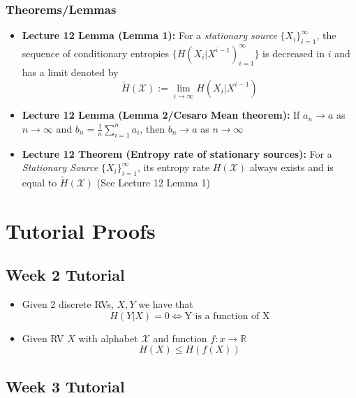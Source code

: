 \documentclass{article}
\begin{document}
\subsubsection{Theorems/Lemmas}
\begin{itemize}
    \item \textbf{Lecture 12 Lemma (Lemma 1): } For a \textit{stationary source} \(\{X_i\}^\infty_{i=1}\), the sequence of conditionary entropies \(\{H(X_i|X^{i-1})_{i=1}^\infty\}\) is decreased in \(i\) and has a limit denoted by
    \[\tilde{H}(\mathcal{X}) := \lim_{i \to \infty} H(X_i | X^{i-1})\]
    \item \textbf{Lecture 12 Lemma (Lemma 2/Cesaro Mean theorem): } If \(a_n \to a\) as \(n \to \infty\) and \(b_n = \frac{1}{n} \sum_{i=1}^{n}a_i\), then \(b_n \to a\) as \(n \to \infty\) %
    \item \textbf{Lecture 12 Theorem (Entropy rate of stationary sources): } For a \textit{Stationary Source} \(\{X_i\}_{i=1}^\infty\), its entropy rate \(H(\mathcal{X})\) always exists and is equal to \(\tilde{H}(\mathcal{X})\) (See Lecture 12 Lemma 1)

\end{itemize}



\section{Tutorial Proofs}
\subsection{Week 2 Tutorial}
\begin{itemize}
    \item Given 2 discrete RVs, \(X, Y\) we have that
    \[H(Y|X) = 0 \Longleftrightarrow \text{Y is a function of X}\]
    \item Given RV \(X\) with alphabet \(\mathcal{X}\) and function \(f: x \to \mathbb{R}\)
    \[H(X) \leq H(f(X))\]
\end{itemize}
\subsection{Week 3 Tutorial}

\end{document}
